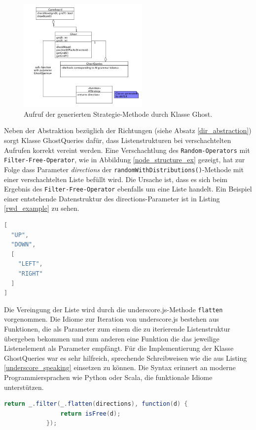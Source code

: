 \documentclass[conference]{IEEEtran}
\begin{document}
\begin{figure}[!htb]
\centering
\includegraphics[width=2.5in]{queries.png}
\caption{Aufruf der generierten Strategie-Methode durch Klasse Ghost.}
\label{ai_call}
\end{figure}

Neben der Abstraktion bezüglich der Richtungen (siehe Absatz \ref{dir_abstraction}) sorgt Klasse GhostQueries dafür, dass Listenstrukturen bei verschachtelten Aufrufen korrekt vereint werden. Eine Verschachtlung des \texttt{Random-Operators} mit \texttt{Filter-Free-Operator}, wie in
Abbildung \ref{node_structure_ex} gezeigt, hat zur Folge dass Parameter \emph{directions} der \texttt{randomWithDistributions()}-Methode mit einer verschachtelten Liste
befüllt wird. Die Ursache ist, dass es sich beim Ergebnis des \texttt{Filter-Free-Operator} ebenfalls um eine Liste handelt. Ein Beispiel einer entstehende Datenstruktur des directions-Parameter ist in Listing \ref{rwd_example} zu sehen.

\begin{lstlisting}[language=Java, captionpos=b, caption=Beispiel einer verschachtelten Datenstruktur als directions-Parameter von randomWithDistributions(), label=rwd_example]
[
  "UP",
  "DOWN",
  [
    "LEFT",
    "RIGHT"
  ]
]
\end{lstlisting}


Die Vereingung der Liste wird durch die underscore.js-Methode \texttt{flatten} vorgenommen. Die Idiome zur Iteration von underscore.js bestehen aus Funktionen,
die als Parameter zum einem die zu iterierende Listenstruktur übergeben bekommen und zum anderen eine Funktion die das jeweilige Listenelement
als Parameter empfängt. Für die Implementierung der Klasse GhostQueries war es sehr hilfreich, sprechende Schreibweisen wie die aus Listing \ref{underscore_speaking} einsetzen zu können. Die Syntax erinnert an moderne Programmiersprachen wie Python oder Scala, die funktionale Idiome unterstützen.

\begin{lstlisting}[language=Java, captionpos=b, caption=Implementierung der Filter-Free Methode mit Hilfe von funktionalen Hilfsmitteln von underscore.js, label=underscore_speaking]
return _.filter(_.flatten(directions), function(d) {
                return isFree(d);
            });
\end{lstlisting}
\end{document}
